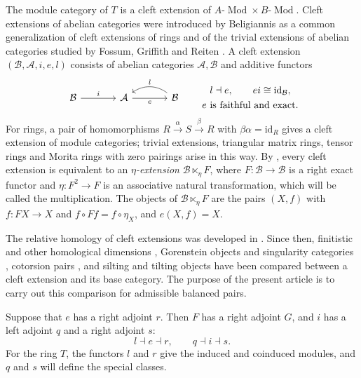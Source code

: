 \documentclass[11pt]{amsart}
\theoremstyle{definition}
\theoremstyle{remark}
\theoremstyle{plain}
\numberwithin{equation}{section}
\begin{document}
The module category of $T$ is a cleft extension of
$A\text{-}\operatorname{Mod} \times B\text{-}\operatorname{Mod}$. Cleft extensions of abelian categories
were introduced by Beligiannis \cite{BelCleft} as a common generalization
of cleft extensions of rings and of the trivial extensions of abelian
categories studied by Fossum, Griffith and Reiten \cite{FGR}. A cleft
extension $(\mathcal{B}, \mathcal{A}, i, e, l)$ consists of abelian categories $\mathcal{A}, \mathcal{B}$ and
additive functors
\[
\begin{tikzcd}[column sep=large]
 \mathcal{B}\arrow[r,"i"]&
 \mathcal{A}\arrow[r,"e"']&
 \mathcal{B}\arrow[l,bend right=35,"l"']
\end{tikzcd}
\qquad
\begin{gathered}
 l \dashv e, \qquad ei \cong \mathrm{id}_{\mathcal{B}}, \\
 e\text{ is faithful and exact}.
\end{gathered}
\]
For rings, a pair of homomorphisms $R\xrightarrow{\alpha}S\xrightarrow{\beta}R$
with $\beta\alpha = \mathrm{id}_R$ gives a cleft extension of module categories;
trivial extensions, triangular matrix rings, tensor rings and Morita
rings with zero pairings arise in this way. By
\cite{BelCleft,Marmaridis}, every cleft extension is equivalent to an
\emph{$\eta$-extension} $\mathcal{B} \ltimes_\eta F$, where $F: \mathcal{B} \to \mathcal{B}$ is a right
exact functor and $\eta: F^2 \to F$ is an associative natural
transformation, which will be called the multiplication. The objects of
$\mathcal{B} \ltimes_\eta F$ are the pairs $(X, f)$ with $f: FX \to X$ and
$f \circ Ff = f \circ \eta_X$, and $e(X, f) = X$.

The relative homology of cleft extensions was developed in
\cite{BelRelative}. Since then, finitistic and other homological
dimensions \cite{GreenPsaroudakisSolberg,MaZhengLiu}, Gorenstein objects
and singularity categories \cite{Kostas,LiangMaYang,Qin}, cotorsion pairs
\cite{ChenQinYang,Hu,LiuGao}, and silting and tilting objects
\cite{ZhaoSunSilting} have been compared between a cleft extension and
its base category. The purpose of the present article is to carry out
this comparison for admissible balanced pairs.

Suppose that $e$ has a right adjoint $r$. Then $F$ has a right adjoint
$G$, and $i$ has a left adjoint $q$ and a right adjoint $s$:
\[
 l \dashv e \dashv r, \qquad q \dashv i \dashv s.
\]
For the ring $T$, the functors $l$ and $r$ give the induced and coinduced
modules, and $q$ and $s$ will define the special classes.
\end{document}
